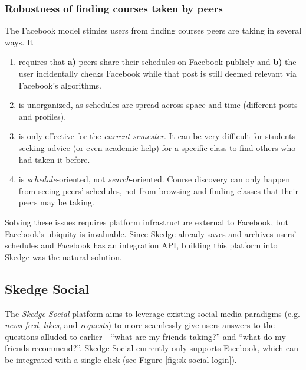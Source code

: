   \subsubsection{Robustness of finding courses taken by peers}

  The Facebook model stimies users from finding courses peers are taking in several ways. It

  \begin{enumerate}
    \item requires that \textbf{a)} peers share their schedules on Facebook publicly and \textbf{b)} the user incidentally checks Facebook while that post is still deemed relevant via Facebook's algorithms.

    \item is unorganized, as schedules are spread across space and time (different posts and profiles).

    \item is only effective for the \emph{current semester}. It can be very difficult for students seeking advice (or even academic help) for a specific class to find others who had taken it before.

    \item is \emph{schedule}-oriented, not \emph{search}-oriented. Course discovery can only happen from seeing peers' schedules, not from browsing and finding classes that their peers may be taking.

  \end{enumerate}

  Solving these issues requires platform infrastructure external to Facebook, but Facebook's ubiquity is invaluable. Since Skedge already saves and archives users' schedules and Facebook has an integration API, building this platform into Skedge was the natural solution.

 
\subsection{Skedge Social}

The \emph{Skedge Social} platform aims to leverage existing social media paradigms (e.g. \emph{news feed}, \emph{likes}, and \emph{requests}) to more seamlessly give users answers to the questions alluded to earlier---``what are my friends taking?'' and ``what do my friends recommend?''. Skedge Social currently only supports Facebook, which can be integrated with a single click (see Figure \ref{fig:sk-social-login}).
  
